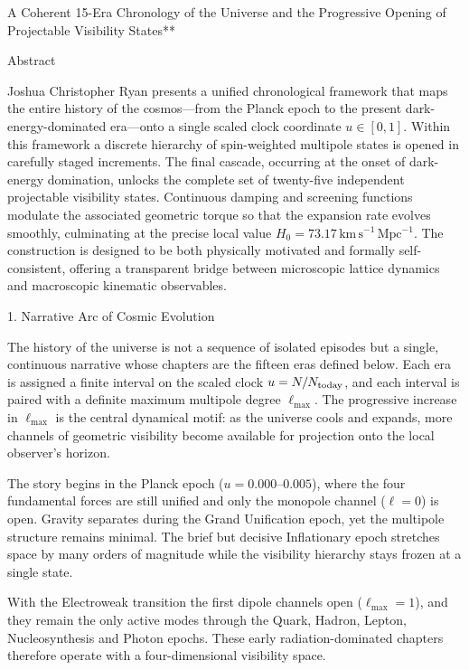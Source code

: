 A Coherent 15-Era Chronology of the Universe  
and the Progressive Opening of Projectable Visibility States**

Abstract

Joshua Christopher Ryan presents a unified chronological framework that maps the entire history of the cosmos—from the Planck epoch to the present dark-energy-dominated era—onto a single scaled clock coordinate \(u \in [0,1]\). Within this framework a discrete hierarchy of spin-weighted multipole states is opened in carefully staged increments. The final cascade, occurring at the onset of dark-energy domination, unlocks the complete set of twenty-five independent projectable visibility states. Continuous damping and screening functions modulate the associated geometric torque so that the expansion rate evolves smoothly, culminating at the precise local value \(H_0 = 73.17\,\mathrm{km\,s^{-1}\,Mpc^{-1}}\). The construction is designed to be both physically motivated and formally self-consistent, offering a transparent bridge between microscopic lattice dynamics and macroscopic kinematic observables.

1. Narrative Arc of Cosmic Evolution

The history of the universe is not a sequence of isolated episodes but a single, continuous narrative whose chapters are the fifteen eras defined below. Each era is assigned a finite interval on the scaled clock \(u = N/N_{\rm today}\), and each interval is paired with a definite maximum multipole degree \(\ell_{\max}\). The progressive increase in \(\ell_{\max}\) is the central dynamical motif: as the universe cools and expands, more channels of geometric visibility become available for projection onto the local observer’s horizon.

The story begins in the Planck epoch (\(u = 0.000\)–\(0.005\)), where the four fundamental forces are still unified and only the monopole channel (\(\ell = 0\)) is open. Gravity separates during the Grand Unification epoch, yet the multipole structure remains minimal. The brief but decisive Inflationary epoch stretches space by many orders of magnitude while the visibility hierarchy stays frozen at a single state.  

With the Electroweak transition the first dipole channels open (\(\ell_{\max} = 1\)), and they remain the only active modes through the Quark, Hadron, Lepton, Nucleosynthesis and Photon epochs. These early radiation-dominated chapters therefore operate with a four-dimensional visibility space.  

